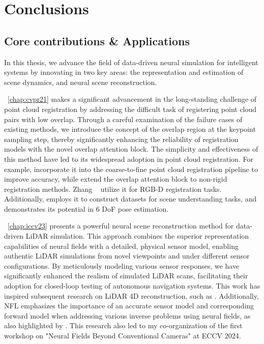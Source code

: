 \chapter{Conclusions}
\label{chap:conclusion}

\section{Core contributions \& Applications}
In this thesis, we advance the field of data-driven neural simulation for intelligent systems by innovating in two key areas: the representation and estimation of scene dynamics, and neural scene reconstruction.

~\cref{chap:cvpr21} makes a significant advancement in the long-standing challenge of point cloud registration by addressing the difficult task of registering point cloud pairs with low overlap. Through a careful examination of the failure cases of existing methods, we introduce the concept of the overlap region at the keypoint sampling step, thereby significantly enhancing the reliability of registration models with the novel overlap attention block. The simplicity and effectiveness of this method have led to its widespread adoption in point cloud registration. For example, \cite{qin2023geotransformer,yu2021cofinet} incorporate it into the coarse-to-fine point cloud registration pipeline to improve accuracy, while \cite{attaiki2021dpfm,li2022lepard} extend the overlap attention block to non-rigid registration methods. Zhang \etal~\cite{zhang2022pcr} utilize it for RGB-D registration tasks. Additionally, \cite{delitzas2024scenefun3d} employs it to construct datasets for scene understanding tasks, and \cite{wen2024foundationpose} demonstrates its potential in 6 DoF pose estimation.

~\cref{chap:iccv23} presents a powerful neural scene reconstruction method for data-driven LiDAR simulation. This approach combines the superior representation capabilities of neural fields with a detailed, physical sensor model, enabling authentic LiDAR simulations from novel viewpoints and under different sensor configurations. By meticulously modeling various sensor responses, we have significantly enhanced the realism of simulated LiDAR scans, facilitating their adoption for closed-loop testing of autonomous navigation systems. This work has inspired subsequent research on LiDAR 4D reconstruction, such as \cite{zheng2024lidar4d,zhong20243d}. Additionally, NFL emphasizes the importance of an accurate sensor model and corresponding forward model when addressing various inverse problems using neural fields, as also highlighted by \cite{ehret2024radar,klinghoffer2024platonerf}. This research also led to my co-organization of the first workshop on "Neural Fields Beyond Conventional Cameras" at ECCV 2024.

